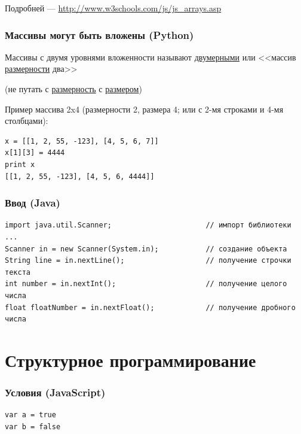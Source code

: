 {\begin{frame}[fragile]
  \vspace{0.5cm}
  Подробней --- \url{http://www.w3schools.com/js/js\_arrays.asp}
\end{frame}

\begin{frame}[fragile]
  \frametitle{Массивы могут быть вложены (Python)}
  Массивы с двумя уровнями вложенности называют \underline{двумерными} или
  <<массив \underline{размерности} два>>

  (не путать с \underline{размерность} с \underline{размером})

  Пример массива 2x4 (размерности 2, размера 4; или с 2-мя строками и 4-мя столбцами):

  \vspace{0.5cm}
  \begin{verbatim}
x = [[1, 2, 55, -123], [4, 5, 6, 7]]
x[1][3] = 4444
print x
[[1, 2, 55, -123], [4, 5, 6, 4444]]
  \end{verbatim}
\end{frame}

\begin{frame}[fragile]
  \frametitle{Ввод (Java)}
  \begin{verbatim}
import java.util.Scanner;                      // импорт библиотеки
...
Scanner in = new Scanner(System.in);           // создание объекта
String line = in.nextLine();                   // получение строчки текста
int number = in.nextInt();                     // получение целого числа
float floatNumber = in.nextFloat();            // получение дробного числа
  \end{verbatim}
\end{frame}



\section{Структурное программирование}
\begin{frame}[fragile]
\frametitle{Условия (JavaScript)}
  \begin{verbatim}
var a = true
var b = false


\end{verbatim}
\end{frame}}
